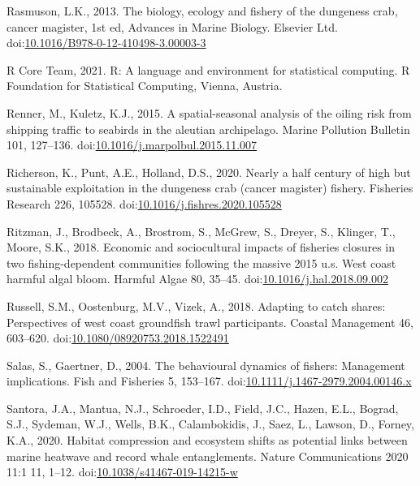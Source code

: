 \documentclass[]{elsarticle} %
\begin{document}
\leavevmode\hypertarget{ref-Rasmuson2013}{}%
Rasmuson, L.K., 2013. The biology, ecology and fishery of the dungeness
crab, cancer magister, 1st ed, Advances in Marine Biology. Elsevier Ltd.
doi:\href{https://doi.org/10.1016/B978-0-12-410498-3.00003-3}{10.1016/B978-0-12-410498-3.00003-3}

\leavevmode\hypertarget{ref-RCoreTeam2021}{}%
R Core Team, 2021. R: A language and environment for statistical
computing. R Foundation for Statistical Computing, Vienna, Austria.

\leavevmode\hypertarget{ref-Renner2015}{}%
Renner, M., Kuletz, K.J., 2015. A spatial-seasonal analysis of the
oiling risk from shipping traffic to seabirds in the aleutian
archipelago. Marine Pollution Bulletin 101, 127--136.
doi:\href{https://doi.org/10.1016/j.marpolbul.2015.11.007}{10.1016/j.marpolbul.2015.11.007}

\leavevmode\hypertarget{ref-Richerson2020}{}%
Richerson, K., Punt, A.E., Holland, D.S., 2020. Nearly a half century of
high but sustainable exploitation in the dungeness crab (cancer
magister) fishery. Fisheries Research 226, 105528.
doi:\href{https://doi.org/10.1016/j.fishres.2020.105528}{10.1016/j.fishres.2020.105528}

\leavevmode\hypertarget{ref-Ritzman2018}{}%
Ritzman, J., Brodbeck, A., Brostrom, S., McGrew, S., Dreyer, S.,
Klinger, T., Moore, S.K., 2018. Economic and sociocultural impacts of
fisheries closures in two fishing-dependent communities following the
massive 2015 u.s. West coast harmful algal bloom. Harmful Algae 80,
35--45.
doi:\href{https://doi.org/10.1016/j.hal.2018.09.002}{10.1016/j.hal.2018.09.002}

\leavevmode\hypertarget{ref-Russell2018}{}%
Russell, S.M., Oostenburg, M.V., Vizek, A., 2018. Adapting to catch
shares: Perspectives of west coast groundfish trawl participants.
Coastal Management 46, 603--620.
doi:\href{https://doi.org/10.1080/08920753.2018.1522491}{10.1080/08920753.2018.1522491}

\leavevmode\hypertarget{ref-Salas2004a}{}%
Salas, S., Gaertner, D., 2004. The behavioural dynamics of fishers:
Management implications. Fish and Fisheries 5, 153--167.
doi:\href{https://doi.org/10.1111/j.1467-2979.2004.00146.x}{10.1111/j.1467-2979.2004.00146.x}

\leavevmode\hypertarget{ref-Santora2020}{}%
Santora, J.A., Mantua, N.J., Schroeder, I.D., Field, J.C., Hazen, E.L.,
Bograd, S.J., Sydeman, W.J., Wells, B.K., Calambokidis, J., Saez, L.,
Lawson, D., Forney, K.A., 2020. Habitat compression and ecosystem shifts
as potential links between marine heatwave and record whale
entanglements. Nature Communications 2020 11:1 11, 1--12.
doi:\href{https://doi.org/10.1038/s41467-019-14215-w}{10.1038/s41467-019-14215-w}
\end{document}
